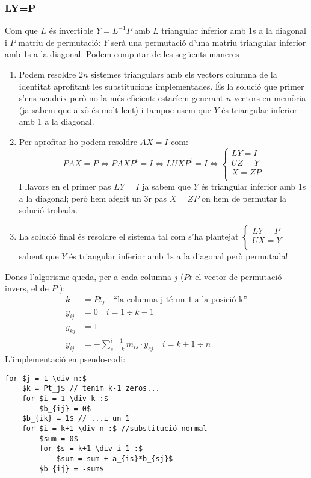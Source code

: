 \documentclass[a4paper,10pt]{article}
\begin{document}
\subsubsection{LY=P}
Com que $L$ és invertible $Y=L^{-1}P$ amb $L$ triangular inferior amb 1s a la diagonal i $P$ matriu de permutació: $Y$ serà una permutació d'una matriu
triangular inferior amb 1s a la diagonal. Podem computar de les següents maneres
\begin{enumerate}
 \item Podem resoldre $2n$ sistemes triangulars amb els vectors columna de la identitat aprofitant les substitucions implementades. És la solució que primer
 s'ens acudeix però no la més eficient: estaríem generant $n$ vectors en memòria (ja sabem que això és molt lent) i tampoc usem que $Y$ és
 triangular inferior amb 1 a la diagonal.
 \item Per aprofitar-ho podem resoldre $AX=I$ com:
 \[
PAX = P \iff PAXP^t=I \iff LUXP^t = I \iff \left\{\begin{array}{c}
LY = I \\
UZ = Y \\
X = ZP \\
\end{array}
\right.
 \]
 I llavors en el primer pas $LY=I$ ja sabem que $Y$ és triangular inferior amb 1s a la diagonal; però hem afegit un 3r pas $X=ZP$ on hem de permutar la
 solució trobada.
 \item La solució final és resoldre el sistema tal com s'ha plantejat
 $\left\{\begin{array}{c}
   LY = P \\
   UX = Y \\
  \end{array}
  \right.
 $
 sabent que $Y$ és triangular inferior amb 1s a la diagonal però permutada!
\end{enumerate}
Doncs l'algorisme queda, per a cada columna $j$ ($Pt$ el vector de permutació invers, el de $P^t$):
\begin{align*}
 k &= Pt_j \quad \text{``la columna j té un 1 a la posició k''} \\
 y_{ij} &= 0 \quad i = 1 \div k-1 \\
 y_{kj} &= 1 \\
 y_{ij} &= -\sum_{s=k}^{i-1}m_{is}\cdot y_{sj} \quad i = k+1 \div n
\end{align*}
L'implementació en pseudo-codi:
\begin{lstlisting}[mathescape]
for $j = 1 \div n:$
    $k = Pt_j$ // tenim k-1 zeros...
    for $i = 1 \div k :$
        $b_{ij} = 0$
    $b_{ik} = 1$ // ...i un 1
    for $i = k+1 \div n :$ //substitució normal
        $sum = 0$
        for $s = k+1 \div i-1 :$
            $sum = sum + a_{is}*b_{sj}$
        $b_{ij} = -sum$
\end{lstlisting}
\end{document}
